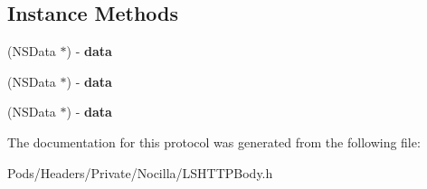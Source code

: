 \subsection*{Instance Methods}
\begin{DoxyCompactItemize}
\item 
\hypertarget{protocol_l_s_h_t_t_p_body-p_acf075db1d4b739099b683e692d333cc6}{(N\-S\-Data $\ast$) -\/ {\bfseries data}}\label{protocol_l_s_h_t_t_p_body-p_acf075db1d4b739099b683e692d333cc6}

\item 
\hypertarget{protocol_l_s_h_t_t_p_body-p_acf075db1d4b739099b683e692d333cc6}{(N\-S\-Data $\ast$) -\/ {\bfseries data}}\label{protocol_l_s_h_t_t_p_body-p_acf075db1d4b739099b683e692d333cc6}

\item 
\hypertarget{protocol_l_s_h_t_t_p_body-p_acf075db1d4b739099b683e692d333cc6}{(N\-S\-Data $\ast$) -\/ {\bfseries data}}\label{protocol_l_s_h_t_t_p_body-p_acf075db1d4b739099b683e692d333cc6}

\end{DoxyCompactItemize}


The documentation for this protocol was generated from the following file\-:\begin{DoxyCompactItemize}
\item 
Pods/\-Headers/\-Private/\-Nocilla/L\-S\-H\-T\-T\-P\-Body.\-h\end{DoxyCompactItemize}
